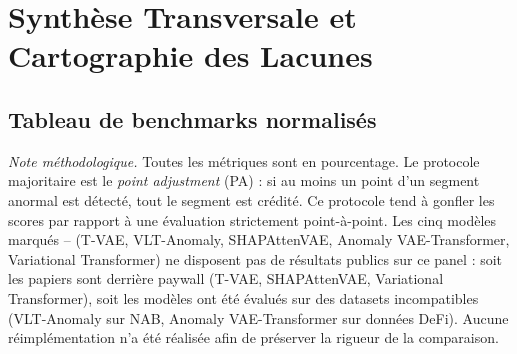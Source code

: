\documentclass[12pt,a4paper]{article}
\newcommand{\nd}{--}
\begin{document}
\section{Synthèse Transversale et Cartographie des Lacunes}

\subsection{Tableau de benchmarks normalisés}

\textit{Note méthodologique.} Toutes les métriques sont en pourcentage. Le
protocole majoritaire est le \textit{point adjustment} (PA) : si au moins un
point d'un segment anormal est détecté, tout le segment est crédité. Ce
protocole tend à gonfler les scores par rapport à une évaluation strictement
point-à-point. Les cinq modèles marqués \nd{} (T-VAE, VLT-Anomaly,
SHAPAttenVAE, Anomaly VAE-Transformer, Variational Transformer) ne disposent
pas de résultats publics sur ce panel : soit les papiers sont derrière paywall
(T-VAE, SHAPAttenVAE, Variational Transformer), soit les modèles ont été
évalués sur des datasets incompatibles (VLT-Anomaly sur NAB, Anomaly
VAE-Transformer sur données DeFi). Aucune réimplémentation n'a été réalisée
afin de préserver la rigueur de la comparaison.
\end{document}
